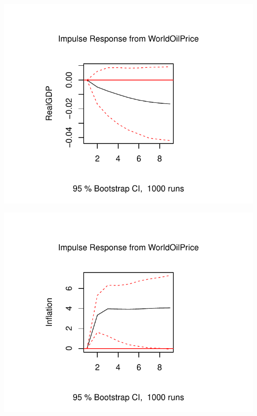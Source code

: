 \documentclass[11pt,preprint, authoryear]{elsarticle}
\numberwithin{equation}{section}
\numberwithin{figure}{section}
\numberwithin{table}{section}
\begin{document}
\begin{center}\includegraphics{README_files/figure-latex/unnamed-chunk-8-3} \end{center}

\begin{center}\includegraphics{README_files/figure-latex/unnamed-chunk-8-4} \end{center}
\end{document}
